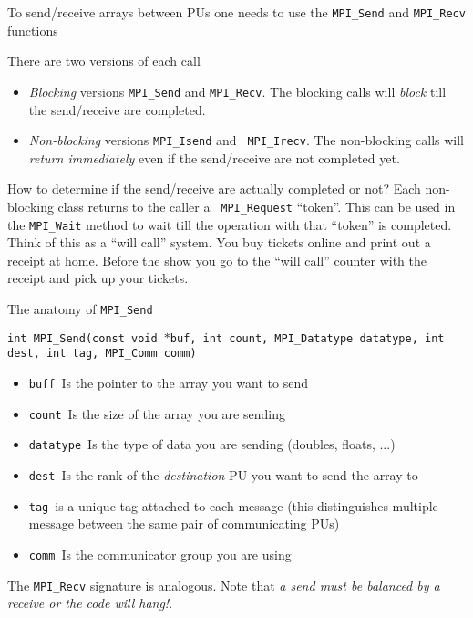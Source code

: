 \documentclass[aspectratio=169]{beamer}
\newcommand{\mypause}{\pause}
\newcommand{\myb}[1]{{\color{blue} {#1}}}
\begin{document}
\begin{frame}{To send/receive arrays between PUs one needs to use the
    {\tt MPI\_Send} and {\tt MPI\_Recv} functions}

  There are two versions of each call
  \begin{itemize}
  \item \emph{Blocking} versions {\tt MPI\_Send} and {\tt MPI\_Recv}.
    The blocking calls will \emph{block} till the send/receive are
    completed.
  \item \emph{Non-blocking} versions {\tt MPI\_Isend} and {\tt
      MPI\_Irecv}.   The non-blocking calls will \emph{return immediately} even if the
    send/receive are not completed yet.
  \end{itemize}
  \mypause%
  \vskip0.1in%
  How to determine if the send/receive are actually completed or not?%
  \vskip0.1in%
  {\color{blue} Each non-blocking class returns to the caller a {\tt
      MPI\_Request} ``token''. This can be used in the {\tt MPI\_Wait}
    method to wait till the operation with that ``token'' is
    completed.}%
  \vskip0.1in%
  Think of this as a ``will call'' system. You buy tickets online and
  print out a receipt at home. Before the show you go to the ``will
  call'' counter with the receipt and pick up your tickets.

\end{frame}

\begin{frame}{The anatomy of {\tt MPI\_Send}}

  {\color{blue} {\tt int MPI\_Send(const void $*$buf, int count,
      MPI\_Datatype datatype, int dest, int tag, MPI\_Comm comm)}}
  \begin{itemize}
  \item \myb{{\tt buff}}\ Is the pointer to the array you want to send
  \item \myb{\tt count}\ Is the size of the array you are sending
  \item \myb{\tt datatype}\ Is the type of data you are sending (doubles,
    floats, ...)
  \item \myb{\tt dest}\ Is the rank of the \emph{destination} PU you want
    to send the array to
  \item \myb{\tt tag}\ is a unique tag attached to each message (this
    distinguishes multiple message between the same pair of
    communicating PUs)
  \item \myb{\tt comm}\ Is the communicator group you are using
  \end{itemize}
  The {\tt MPI\_Recv} signature is analogous. Note that \emph{a send
    must be balanced by a receive or the code will hang!}.

\end{frame}
\end{document}
